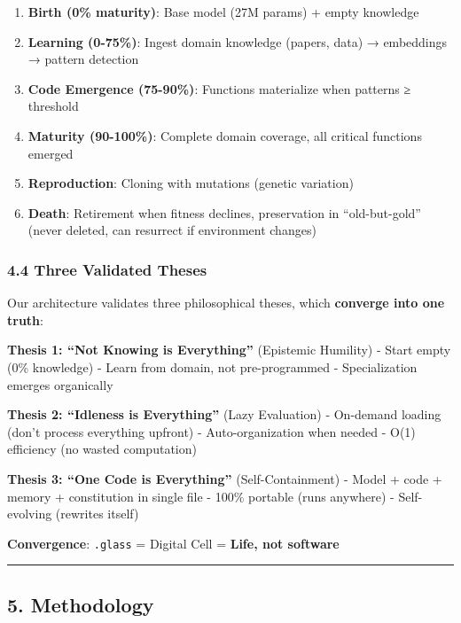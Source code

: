 \documentclass[
]{article}
\providecommand{\tightlist}{%
  \setlength{\itemsep}{0pt}\setlength{\parskip}{0pt}}
\begin{document}
\begin{enumerate}
\def\labelenumi{\arabic{enumi}.}
\tightlist
\item
  \textbf{Birth (0\% maturity)}: Base model (27M params) + empty
  knowledge
\item
  \textbf{Learning (0-75\%)}: Ingest domain knowledge (papers, data) →
  embeddings → pattern detection
\item
  \textbf{Code Emergence (75-90\%)}: Functions materialize when patterns
  ≥ threshold
\item
  \textbf{Maturity (90-100\%)}: Complete domain coverage, all critical
  functions emerged
\item
  \textbf{Reproduction}: Cloning with mutations (genetic variation)
\item
  \textbf{Death}: Retirement when fitness declines, preservation in
  ``old-but-gold'' (never deleted, can resurrect if environment changes)
\end{enumerate}

\subsubsection{4.4 Three Validated Theses}\label{three-validated-theses}

Our architecture validates three philosophical theses, which
\textbf{converge into one truth}:

\textbf{Thesis 1: ``Not Knowing is Everything''} (Epistemic Humility) -
Start empty (0\% knowledge) - Learn from domain, not pre-programmed -
Specialization emerges organically

\textbf{Thesis 2: ``Idleness is Everything''} (Lazy Evaluation) -
On-demand loading (don't process everything upfront) - Auto-organization
when needed - O(1) efficiency (no wasted computation)

\textbf{Thesis 3: ``One Code is Everything''} (Self-Containment) - Model
+ code + memory + constitution in single file - 100\% portable (runs
anywhere) - Self-evolving (rewrites itself)

\textbf{Convergence}: \texttt{.glass} = Digital Cell = \textbf{Life, not
software}

\begin{center}\rule{0.5\linewidth}{0.5pt}\end{center}

\subsection{5. Methodology}\label{methodology}
\end{document}
